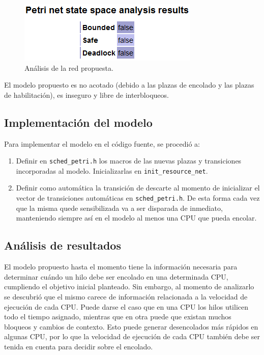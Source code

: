 \documentclass[a4paper]{book}
\begin{document}
\begin{figure} [H]
	\begin{center}
        \includegraphics[scale=0.7]{./imagenes/it5validacion.png}
		\caption{An\'alisis de la red propuesta.}
		\label{Fig:validacion5}
	\end{center}
\end{figure}

El modelo propuesto es no acotado (debido a las plazas de encolado y las plazas de habilitaci\'on), es inseguro y libre de interbloqueos.

\subsection{Implementaci\'on del modelo}
Para implementar el modelo en el c\'odigo fuente, se procedi\'o a:
\begin{enumerate}
\item Definir en \verb|sched_petri.h| los macros de las nuevas plazas y transiciones incorporadas al modelo. Inicializarlas en \verb|init_resource_net|.
\item Definir como autom\'atica la transici\'on de descarte al momento de inicializar el vector de transiciones autom\'aticas en \verb|sched_petri.h|. De esta forma cada vez que la misma quede sensibilizada va a ser disparada de inmediato, manteniendo siempre as\'i en el modelo al menos una CPU que pueda encolar.
\end{enumerate}

\subsection{An\'alisis de resultados}
El modelo propuesto hasta el momento tiene la informaci\'on necesaria para determinar cu\'ando un hilo debe ser encolado en una determinada CPU, cumpliendo el objetivo inicial planteado.  Sin embargo, al momento de analizarlo se descubri\'o que el mismo carece de informaci\'on relacionada a la velocidad de ejecuci\'on de cada CPU. Puede darse el caso que en una CPU los hilos utilicen todo el tiempo asignado, mientras que en otra puede que existan muchos bloqueos y cambios de contexto. Esto puede generar desencolados m\'as r\'apidos en algunas CPU, por lo que la velocidad de ejecuci\'on de cada CPU también debe ser tenida en cuenta para decidir sobre el encolado.
\end{document}
